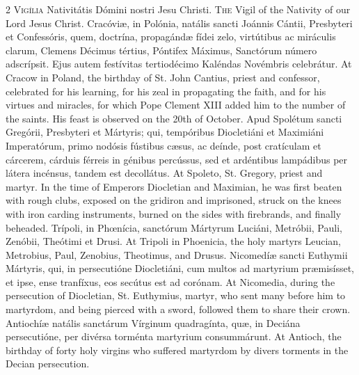 \begin{paracol}{2}
\lettrine[lines=1]{V}{igília} Nativitátis Dómini nostri Jesu Christi.
\switchcolumn
{}
\lettrine[lines=1]{T}{he} Vigil of the Nativity of our Lord Jesus Christ.
\switchcolumn*
{}
Cracóviæ, in Polónia, natális sancti Joánnis 
 Cántii, Presbyteri et Confessóris, quem, doctrína, propagándæ fídei zelo, 
 virtútibus ac miráculis clarum, Clemens Décimus tértius, Póntifex Máximus, 
 Sanctórum número adscrípsit. Ejus autem festívitas tertiodécimo 
 Kaléndas Novémbris celebrátur.
\switchcolumn
{}
At Cracow in Poland, the birthday of St. John Cantius, priest and confessor, 
 celebrated for his learning, for his zeal in propagating the faith, and for 
 his virtues and miracles, for which Pope Clement XIII added him to the 
 number of the saints. His feast is observed on the 20th of October.
\switchcolumn*
{}
Apud Spolétum sancti Gregórii, Presbyteri et Mártyris; qui, tempóribus 
 Diocletiáni et Maximiáni Imperatórum, primo nodósis fústibus cæsus, 
 ac deínde, post cratículam et cárcerem, cárduis férreis in génibus percússus, 
 sed et ardéntibus lampádibus per látera incénsus, tandem est decollátus.
\switchcolumn
{}
At Spoleto, St. Gregory, priest and martyr. In the time of Emperors 
 Diocletian and Maximian, he was first beaten with rough clubs, exposed on 
 the gridiron and imprisoned, struck on the knees with iron carding 
 instruments, burned on the sides with firebrands, and finally beheaded.
\switchcolumn*
{}
Trípoli, in Phœnícia, sanctórum Mártyrum Luciáni, Metróbii, Pauli, Zenóbii,
  Theótimi et Drusi.
\switchcolumn
{}
At Tripoli in Phoenicia, the holy martyrs Leucian, Metrobius, Paul, Zenobius, 
 Theotimus, and Drusus.
\switchcolumn*
{}
Nicomedíæ sancti Euthymii Mártyris, qui, in 
 persecutióne Diocletiáni, cum multos ad martyrium præmisísset, et ipse, ense 
 tranfíxus, eos secútus est ad corónam.
\switchcolumn
{}
At Nicomedia, during the persecution of Diocletian, St. Euthymius, martyr, 
 who sent many before him to martyrdom, and being pierced with a sword, 
 followed them to share their crown.
\switchcolumn*
{}
Antiochíæ natális sanctárum Vírginum 
 quadragínta, quæ, in Deciána persecutióne, per divérsa torménta martyrium 
 consummárunt.
\switchcolumn
{}
At Antioch, the birthday of forty holy virgins who suffered martyrdom by 
 divers torments in the Decian persecution.

\end{paracol}
